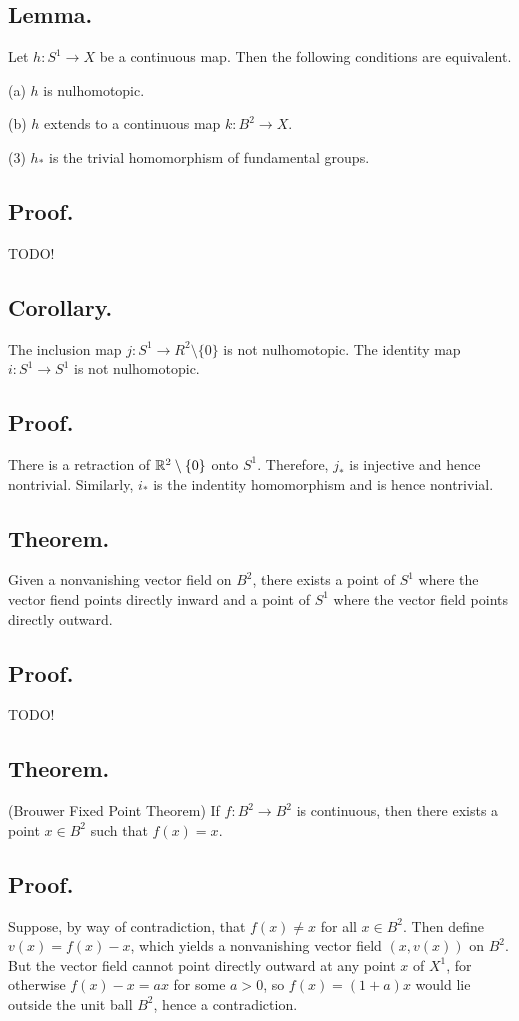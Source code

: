 \documentclass[titlepage]{article}
\begin{document}
\subsection{Lemma.} Let $h: S^{1} \to X$ be a continuous map. Then the following conditions are equivalent.

(a) $h$ is nulhomotopic.

(b) $h$ extends to a continuous map $k: B^{2} \to X$.

(3) $h_{*}$ is the trivial homomorphism of fundamental groups.

\subsection{Proof.} TODO!

\subsection{Corollary.} The inclusion map $j: S^{1} \to R^{2} \setminus \{0\}$ is not nulhomotopic. The identity map $i: S^{1} \to S^{1}$ is not nulhomotopic.

\subsection{Proof.} There is a retraction of $\mathbb{R}^{2} \setminus \{0\}$ onto $S^{1}$. Therefore, $j_{*}$ is injective and hence nontrivial. Similarly, $i_{*}$ is the indentity homomorphism and is hence nontrivial.

\subsection{Theorem.} Given a nonvanishing vector field on $B^{2}$, there exists a point of $S^{1}$ where the vector fiend points directly inward and a point of $S^{1}$ where the vector field points directly outward.

\subsection{Proof.} TODO!

\subsection{Theorem.} (Brouwer Fixed Point Theorem) If $f: B^{2} \to B^{2}$ is continuous, then there exists a point $x \in B^{2}$ such that $f(x) = x$.

\subsection{Proof.} Suppose, by way of contradiction, that $f(x) \neq x$ for all $x \in B^{2}$. Then define $v(x) = f(x) - x$, which yields a nonvanishing vector field $(x, v(x))$ on $B^{2}$. But the vector field cannot point directly outward at any point $x$ of $X^{1}$, for otherwise $f(x) - x = ax$ for some $a > 0$, so $f(x) = (1 + a)x$ would lie outside the unit ball $B^{2}$, hence a contradiction.
\end{document}
